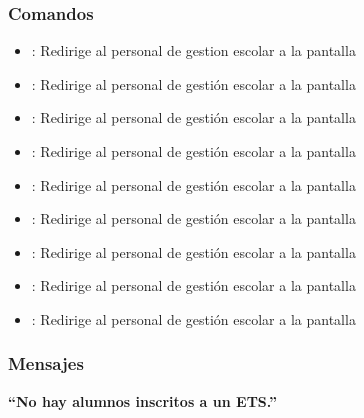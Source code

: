 \subsubsection{Comandos}
\begin{itemize}
	\item {}: Redirige al personal de gestion escolar a la pantalla 
	
	\item {}: Redirige al personal de gestión escolar a la pantalla 
	\item {}: Redirige al personal de gestión escolar a la pantalla 
	
	\item {}: Redirige al personal de gestión escolar a la pantalla 
	\item {}: Redirige al personal de gestión escolar a la pantalla 
	
	\item {}: Redirige al personal de gestión escolar a la pantalla 
	\item {}: Redirige al personal de gestión escolar a la pantalla 
	
	\item {}: Redirige al personal de gestión escolar a la pantalla 
	\item {}: Redirige al personal de gestión escolar a la pantalla    
\end{itemize}

\subsubsection{Mensajes}

\begin{Citemize}
	\item {\bf  ``No hay alumnos inscritos a un ETS.''}
\end{Citemize}

